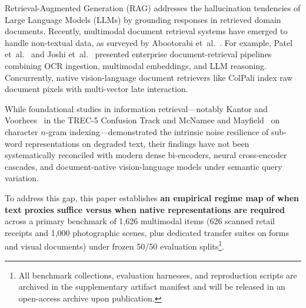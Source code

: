 Retrieval-Augmented Generation (RAG) \cite{lewis2020rag} addresses the hallucination tendencies of Large Language Models (LLMs) by grounding responses in retrieved domain documents. Recently, multimodal document retrieval systems have emerged to handle non-textual data, as surveyed by Abootorabi et~al.~\cite{abootorabi2025multimodal}. For example, Patel et~al.~\cite{patel2025multimodal} and Joshi et~al.~\cite{joshi2024multimodel} presented enterprise document-retrieval pipelines combining OCR ingestion, multimodal embeddings, and LLM reasoning. Concurrently, native vision-language document retrievers like ColPali \cite{faysse2024colpali} index raw document pixels with multi-vector late interaction.

While foundational studies in information retrieval---notably Kantor and Voorhees~\cite{kantor2000confusion} in the TREC-5 Confusion Track and McNamee and Mayfield~\cite{mcnamee2004character} on character $n$-gram indexing---demonstrated the intrinsic noise resilience of sub-word representations on degraded text, their findings have not been systematically reconciled with modern dense bi-encoders, neural cross-encoder cascades, and document-native vision-language models under semantic query variation. 

To address this gap, this paper establishes \textbf{an empirical regime map of when text proxies suffice versus when native representations are required} across a primary benchmark of 1,626 multimodal items (626 scanned retail receipts and 1,000 photographic scenes, plus dedicated transfer suites on forms and visual documents) under frozen 50/50 evaluation splits\footnote{All benchmark collections, evaluation harnesses, and reproduction scripts are archived in the supplementary artifact manifest and will be released in an open-access archive upon publication.}.

